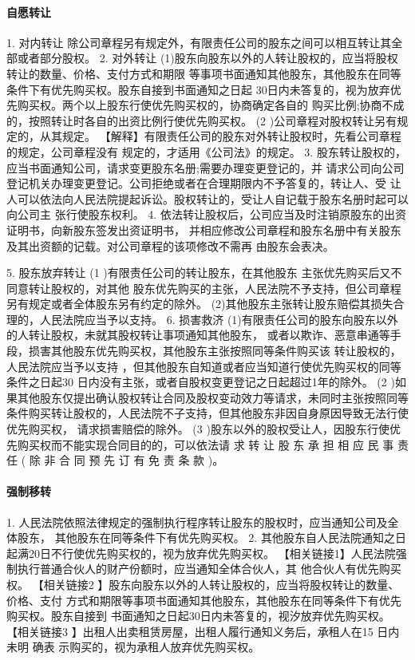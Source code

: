 \documentclass[UTF8,12pt]{ctexart}
\numberwithin{equation}{section} %
\numberwithin{figure}{section}
\numberwithin{table}{section}
\begin{document}
	\paragraph{自愿转让}
	1. 对内转让 除公司章程另有规定外，有限责任公司的股东之间可以相互转让其全部或者部分股权。 2. 对外转让 (1)股东向股东以外的人转让股权的，应当将股权转让的数量、价格、支付方式和期限 等事项书面通知其他股东，其他股东在同等条件下有优先购买权。股东自接到书面通知之日起 30日内未答复的，视为放弃优先购买权。两个以上股东行使优先购买权的，协商确定各自的 购买比例;协商不成的，按照转让时各自的出资比例行使优先购买权。
	(2 )公司章程对股权转让另有规定的，从其规定。 【解释】有限责任公司的股东对外转让股权时，先看公司章程的规定，公司章程没有 规定的，才适用《公司法》的规定。
	3. 股东转让股权的，应当书面通知公司，请求变更股东名册;需要办理变更登记的，并 请求公司向公司登记机关办理变更登记。公司拒绝或者在合理期限内不予答复的，转让人、受 让人可以依法向人民法院提起诉讼。股权转让的，受让人自记载于股东名册时起可以向公司主 张行使股东权利。
	4. 依法转让股权后，公司应当及时注销原股东的出资证明书，向新股东签发出资证明书， 并相应修改公司章程和股东名册中有关股东及其出资额的记载。对公司章程的该项修改不需再 由股东会表决。
	
	
	5. 股东放弃转让
	(1 )有限责任公司的转让股东，在其他股东 主张优先购买后又不同意转让股权的，对其他 股东优先购买的主张，人民法院不予支持，但公司章程另有规定或者全体股东另有约定的除外。 (2)其他股东主张转让股东赔偿其损失合理的，人民法院应当予以支持。
	6. 损害救济 (1)有限责任公司的股东向股东以外的人转让股权，未就其股权转让事项通知其他股东， 或者以欺诈、恶意串通等手段，损害其他股东优先购买权，其他股东主张按照同等条件购买该 转让股权的，人民法院应当予以支持 ，但其他股东自知道或者应当知道行使优先购买权的同等 条件之日起30 日内没有主张，或者自股权变更登记之日起超过1年的除外。
	(2 )如果其他股东仅提出确认股权转让合同及股权变动效力等请求，未同时主张按照同等 条件购买转让股权的，人民法院不子支持，但其他股东非因自身原因导致无法行使优先购买权， 请求损害赔偿的除外。
	(3 )股东以外的股权受让人，因股东行使优先购买权而不能实现合同目的的，可以依法请 求 转 让 股 东 承 担 相 应 民 事 责 任 ( 除 非 合 同 预 先 订 有 免 责 条 款 )。
	
	\paragraph{强制移转}
	1. 人民法院依照法律规定的强制执行程序转让股东的股权时，应当通知公司及全体股东， 其他股东在同等条件下有优先购买权。
	2. 其他股东自人民法院通知之日起满20日不行使优先购买权的，视为放弃优先购买权。
	【相关链接1】人民法院强制执行普通合伙人的财产份额时，应当通知全体合伙人，其 他合伙人有优先购买权。
	【相关链接2 】股东向股东以外的人转让股权的，应当将股权转让的数量、价格、支付 方式和期限等事项书面通知其他股东，其他股东在同等条件下有优先购买权。股东自接到 书面通知之日起30日内未答复的，视汐放弃优先购买权。
	【相关链接3 】出租人出卖租赁房屋，出租人履行通知义务后，承租人在15 日内未明 确表 示购买的，视为承租人放弃优先购买权。
	
\end{document}
